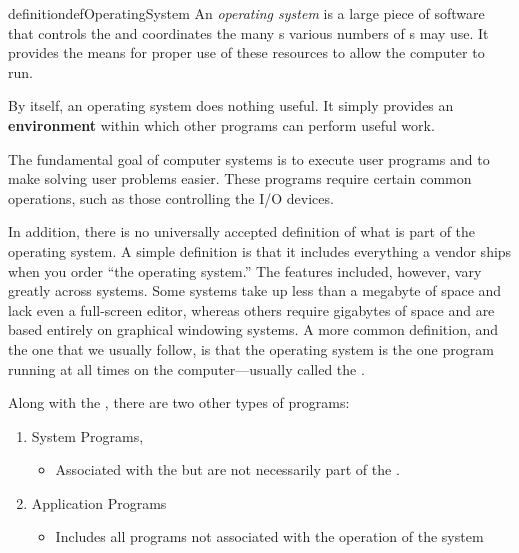 \begin{restatable}{definition}{defOperatingSystem}\label{def:Operating_System}
  An \emph{operating system} is a large piece of software that controls the  and coordinates the many s various numbers of s may use.
  It provides the means for proper use of these resources to allow the computer to run.

  By itself, an operating system does nothing useful.
  It simply provides an \textbf{environment} within which other programs can perform useful work.

  The fundamental goal of computer systems is to execute user programs and to make solving user problems easier.
  These programs require certain common operations, such as those controlling the I/O devices.

  In addition, there is no universally accepted definition of what is part of the operating system.
  A simple definition is that it includes everything a vendor ships when you order ``the operating system.''
  The features included, however, vary greatly across systems.
  Some systems take up less than a megabyte of space and lack even a full-screen editor, whereas others require gigabytes of space and are based entirely on graphical windowing systems.
  A more common definition, and the one that we usually follow, is that the operating system is the one program running at all times on the computer—usually called the .

  \begin{remark}\label{rmk:Kernel_Level_Non_Kernel_Programs}
    Along with the , there are two other types of programs:
    \begin{enumerate}[noitemsep]
    \item System Programs,
      \begin{itemize}[noitemsep]
      \item Associated with the  but are not necessarily part of the .
      \end{itemize}
    \item Application Programs
      \begin{itemize}[noitemsep]
      \item Includes all programs not associated with the operation of the system
      \end{itemize}
    \end{enumerate}
  \end{remark}


\end{restatable}

